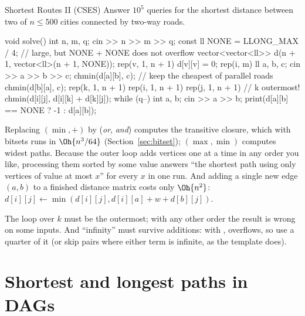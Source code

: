 \begin{problem}{Shortest Routes II (CSES)}
Answer $10^5$ queries for the shortest distance between two of $n \le 500$ cities connected by two-way roads.
\end{problem}

\begin{code}
void solve() {
    int n, m, q;
    cin >> n >> m >> q;
    const ll NONE = LLONG_MAX / 4;  // large, but NONE + NONE does not overflow
    vector<vector<ll>> d(n + 1, vector<ll>(n + 1, NONE));
    rep(v, 1, n + 1) d[v][v] = 0;
    rep(i, m) {
        ll a, b, c;
        cin >> a >> b >> c;
        chmin(d[a][b], c);  // keep the cheapest of parallel roads
        chmin(d[b][a], c);
    }
    rep(k, 1, n + 1) rep(i, 1, n + 1) rep(j, 1, n + 1)  // k outermost!
        chmin(d[i][j], d[i][k] + d[k][j]);
    while (q--) {
        int a, b;
        cin >> a >> b;
        print(d[a][b] == NONE ? -1 : d[a][b]);
    }
}
\end{code}


\begin{trick}
Replacing $(\min, +)$ by (\emph{or}, \emph{and}) computes the transitive closure, which with bitsets runs in $\Oh{n^3/64}$
(Section~\ref{sec:bitset}); $(\max, \min)$ computes widest paths. Because the outer loop adds vertices one at a time in any
order you like, processing them sorted by some value answers ``the shortest path using only vertices of value at most $x$''
for every $x$ in one run. And adding a single new edge $(a, b)$ to a finished distance matrix costs only $\Oh{n^2}$:
$d[i][j] \gets \min(d[i][j], d[i][a] + w + d[b][j])$.
\end{trick}

\begin{pitfall}
The loop over $k$ must be the outermost; with any other order the result is wrong on some inputs. And ``infinity'' must survive
additions: with ,  overflows, so use a quarter of it (or skip pairs where either term is
infinite, as the template does).
\end{pitfall}

\section[Shortest and longest paths in DAGs]{Shortest and longest paths in DAGs \hfill \gold}\label{sec:dagpaths}

